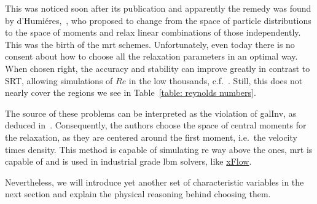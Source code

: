 This was noticed soon after its publication and apparently the remedy was found by d'Humiéres,~\cite{d1994generalized}, who proposed to change from the space of particle distributions to the space of moments and relax linear combinations of those independently.
This was the birth of the \gls{mrt} schemes.
Unfortunately, even today there is no consent about how to choose all the relaxation parameters in an optimal way.
When chosen right, the accuracy and stability can improve greatly in contrast to SRT, allowing simulations of $Re$ in the low thousands, c.f.~\cite{d2002multiple}.
Still, this does not nearly cover the regions we see in Table~\ref{table: reynolds numbers}.

The source of these problems can be interpreted as the violation of \gls{galInv}, as deduced in~\cite{geier2006cascaded}. Consequently, the authors choose the space of central moments for the relaxation, as they are centered around the first moment, i.e.\ the velocity times density.
This method is capable of simulating \gls{re} way above the ones, \gls{mrt} is capable of and is used in industrial grade \gls{lbm} solvers, like \href{http://www.xflowcfd.com/technology/view/cfd}{xFlow}.

Nevertheless, we will introduce yet another set of characteristic variables in the next section and explain the physical reasoning behind choosing them.
